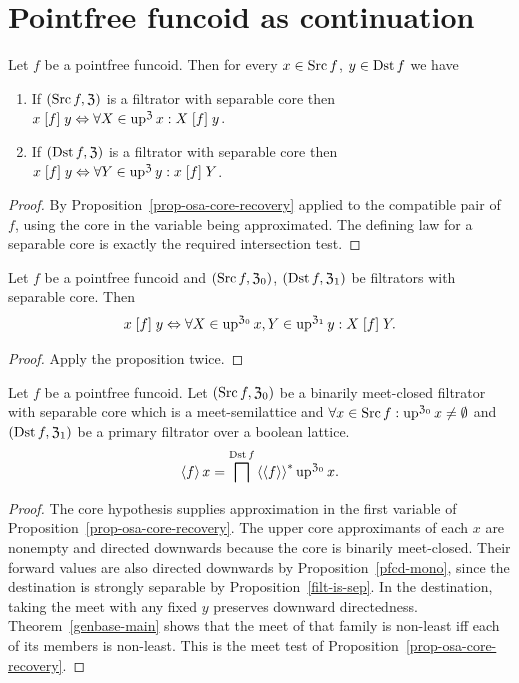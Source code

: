 \section{Pointfree funcoid as continuation}
\begin{prop}
Let $f$ be a pointfree funcoid. Then for every $x\in\operatorname{Src} f$, $y\in\operatorname{Dst} f$
we have
\begin{enumerate}
\item If $(\operatorname{Src} f,\mathfrak{Z})$ is a filtrator with separable core then
$x\mathrel{\left[f\right]}y\Leftrightarrow\forall X\in\operatorname{up}^{\mathfrak{Z}}x:X\mathrel{\left[f\right]}y$.
\item If $(\operatorname{Dst} f,\mathfrak{Z})$ is a filtrator with separable core then
$x\mathrel{\left[f\right]}y\Leftrightarrow\forall Y\in\operatorname{up}^{\mathfrak{Z}}y:x\mathrel{\left[f\right]}Y$.
\end{enumerate}
\end{prop}
\begin{proof}
By Proposition~\ref{prop-osa-core-recovery} applied to the
compatible pair of $f$, using the core in the variable being
approximated. The defining law for a separable core is exactly
the required intersection test.
\end{proof}
\begin{cor}
\label{pf-relatom-both}Let $f$ be a pointfree funcoid and $(\operatorname{Src} f,\mathfrak{Z}_{0})$,
$(\operatorname{Dst} f,\mathfrak{Z}_{1})$ be filtrators with separable core. Then
\[
x\mathrel{\left[f\right]}y\Leftrightarrow\forall X\in\operatorname{up}^{\mathfrak{Z}_{0}}x,Y\in\operatorname{up}^{\mathfrak{Z}_{1}}y:X\mathrel{\left[f\right]}Y.
\]
\end{cor}
\begin{proof}
Apply the proposition twice.\end{proof}
\begin{thm}
\label{pf-supfun-up}Let $f$ be a pointfree funcoid. Let $(\operatorname{Src} f,\mathfrak{Z}_{0})$
be a binarily meet-closed filtrator with separable core which is a
meet-semilattice and $\forall x\in\operatorname{Src} f:\operatorname{up}^{\mathfrak{Z}_{0}}x\neq\emptyset$
and $(\operatorname{Dst} f,\mathfrak{Z}_{1})$ be a primary filtrator over a boolean
lattice.
\[
\left\langle f\right\rangle x=\bigsqcap^{\operatorname{Dst} f}\left\langle \left\langle f\right\rangle\right\rangle ^{\ast}\operatorname{up}^{\mathfrak{Z}_{0}}x.
\]
\end{thm}
\begin{proof}
The core hypothesis supplies approximation in the first variable
of Proposition~\ref{prop-osa-core-recovery}. The upper core
approximants of each $x$ are nonempty and directed downwards because
the core is binarily meet-closed. Their forward values are also
directed downwards by Proposition~\ref{pfcd-mono}, since the
destination is strongly separable by Proposition~\ref{filt-is-sep}.
In the destination, taking the meet with any fixed $y$ preserves
downward directedness. Theorem~\ref{genbase-main} shows that the
meet of that family is non-least iff each of its members is
non-least. This is the meet test of
Proposition~\ref{prop-osa-core-recovery}.
\end{proof}
